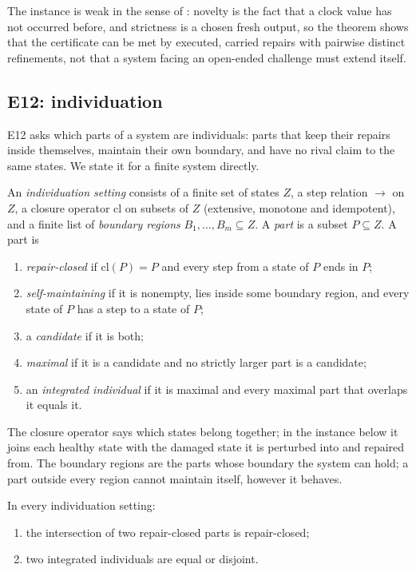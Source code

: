 The instance is weak in the sense of : novelty is the fact that a clock
value has not occurred before, and strictness is a chosen fresh output, so the theorem shows that
the certificate can be met by executed, carried repairs with pairwise distinct refinements, not that
a system facing an open-ended challenge must extend itself.

\subsection{E12: individuation}\label{sec:e12-semantic}

E12 asks which parts of a system are individuals: parts that keep their repairs inside themselves,
maintain their own boundary, and have no rival claim to the same states. We state it for a finite
system directly.

\begin{definition}\label{def:e12-setting}
An \emph{individuation setting} consists of a finite set of states $Z$, a step relation $\to$ on
$Z$, a closure operator $\mathrm{cl}$ on subsets of $Z$ (extensive, monotone and idempotent), and a
finite list of \emph{boundary regions} $B_1, \dots, B_m \subseteq Z$. A \emph{part} is a subset
$P \subseteq Z$. A part is
\begin{enumerate}
  \item \emph{repair-closed} if $\mathrm{cl}(P) = P$ and every step from a state of $P$ ends in $P$;
  \item \emph{self-maintaining} if it is nonempty, lies inside some boundary region, and every state
    of $P$ has a step to a state of $P$;
  \item a \emph{candidate} if it is both;
  \item \emph{maximal} if it is a candidate and no strictly larger part is a candidate;
  \item an \emph{integrated individual} if it is maximal and every maximal part that overlaps it
    equals it.
\end{enumerate}
\end{definition}

The closure operator says which states belong together; in the instance below it joins each healthy
state with the damaged state it is perturbed into and repaired from. The boundary regions are the parts whose boundary
the system can hold; a part outside every region cannot maintain itself, however it behaves.

\begin{proposition}\label{prop:e12-structure}
In every individuation setting:
\begin{enumerate}
  \item the intersection of two repair-closed parts is repair-closed;
  \item two integrated individuals are equal or disjoint.
\end{enumerate}
\end{proposition}


